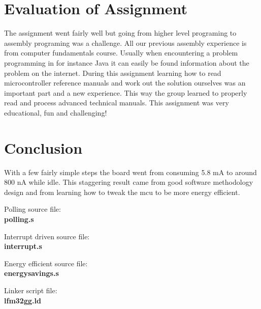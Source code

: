 \section{Evaluation of Assignment}
The assignment went fairly well but going from higher level programing to assembly programing was a challenge. All our previous assembly experience is from computer fundamentals course. Usually when encountering a problem programming in for instance Java it can easily be found information about the problem on the internet. During this assignment learning how to read microcontroller reference manuals and work out the solution ourselves was an important part and a new experience. This way the group learned to properly read and process advanced technical manuals. This assignment was very educational, fun and challenging!

\section{Conclusion}
With a few fairly simple steps the board went from consuming 5.8 mA to around 800 nA while idle. This  staggering result came from good software methodology design and from learning how to tweak the mcu to be more energy efficient. 


\begin{thebibliography}{1}

 Polling source file:\\
\textbf{polling.s}

 Interrupt driven source file:\\
\textbf{interrupt.s}

 Energy efficient source file:\\
\textbf{energysavings.s}

 Linker script file:\\
\textbf{lfm32gg.ld}

\end{thebibliography}


